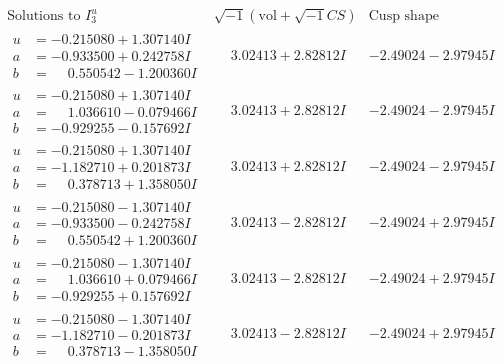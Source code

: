 \documentclass[1p]{elsarticle_modified}
\theoremstyle{definition}
\newcommand{\I}{\sqrt{-1}}
\begin{document}
$$\begin{array}{c|c|c}  
\text{Solutions to }I^u_{3}& \I (\text{vol} + \sqrt{-1}CS) & \text{Cusp shape}\\
 \hline 
\begin{aligned}
u &= -0.215080 + 1.307140 I \\
a &= -0.933500 + 0.242758 I \\
b &= \phantom{-}0.550542 - 1.200360 I\end{aligned}
 & \phantom{-}3.02413 + 2.82812 I & -2.49024 - 2.97945 I \\ \hline\begin{aligned}
u &= -0.215080 + 1.307140 I \\
a &= \phantom{-}1.036610 - 0.079466 I \\
b &= -0.929255 - 0.157692 I\end{aligned}
 & \phantom{-}3.02413 + 2.82812 I & -2.49024 - 2.97945 I \\ \hline\begin{aligned}
u &= -0.215080 + 1.307140 I \\
a &= -1.182710 + 0.201873 I \\
b &= \phantom{-}0.378713 + 1.358050 I\end{aligned}
 & \phantom{-}3.02413 + 2.82812 I & -2.49024 - 2.97945 I \\ \hline\begin{aligned}
u &= -0.215080 - 1.307140 I \\
a &= -0.933500 - 0.242758 I \\
b &= \phantom{-}0.550542 + 1.200360 I\end{aligned}
 & \phantom{-}3.02413 - 2.82812 I & -2.49024 + 2.97945 I \\ \hline\begin{aligned}
u &= -0.215080 - 1.307140 I \\
a &= \phantom{-}1.036610 + 0.079466 I \\
b &= -0.929255 + 0.157692 I\end{aligned}
 & \phantom{-}3.02413 - 2.82812 I & -2.49024 + 2.97945 I \\ \hline\begin{aligned}
u &= -0.215080 - 1.307140 I \\
a &= -1.182710 - 0.201873 I \\
b &= \phantom{-}0.378713 - 1.358050 I\end{aligned}
 & \phantom{-}3.02413 - 2.82812 I & -2.49024 + 2.97945 I \\ \hline\begin{aligned}

\end{aligned}
\end{array}$$
\end{document}
